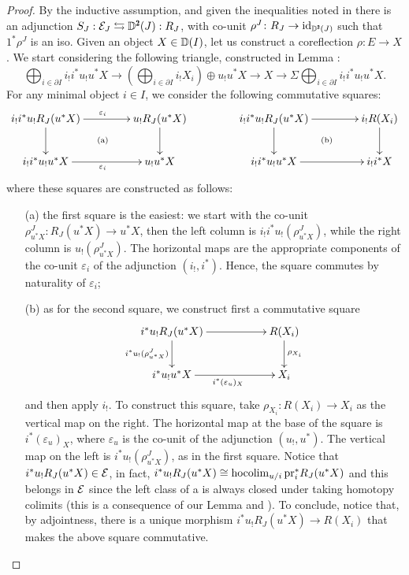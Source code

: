 \begin{proof}
By the inductive assumption, and given the inequalities noted in  there is an adjunction $S_J: \E_J\leftrightarrows \D^\due(J):R_J$, with co-unit $\rho^J\colon R_J\to \id_{\D^\due(J)}$ such that $1^*\rho^J$ is an iso. Given an object $X\in \mathbb{D}(I)$, let us construct a coreflection $\rho\colon E\to X$. We start considering the following triangle, constructed in Lemma :
\[
\bigoplus_{i\in\partial I}i_!i^*u_!u^*{X}\to \left(\bigoplus_{i\in\partial I}i_!{X}_i\right)\oplus u_!u^*{X}\to {X}\to \Sigma \bigoplus_{i\in\partial I}i_!i^*u_!u^*{X}.
\]
For any minimal object $i\in I$, we consider the following commutative squares:
\[
\xymatrix@C=18pt{
i_!i^*u_!R_J(u^*X)\ar@{}[drr]|{(\mathrm{a})}\ar[d]\ar[rr]^{\varepsilon_i}&&u_!R_J(u^*X)\ar[d]&&i_!i^*u_!R_J(u^*X)\ar@{}[drr]|{(\mathrm{b})}\ar[d]\ar[rr]&&i_!R(X_i)\ar[d]\\
i_!i^*u_!u^*X\ar[rr]_{\varepsilon_i}&&u_!u^*X&&i_!i^*u_!u^*X\ar[rr]&&i_!i^*X
}
\]
where these squares are constructed as follows:
\begin{enumerate}
\item[(a)] the first square is the easiest: we start with the co-unit $\rho^J_{u^*X}\colon R_J(u^*X)\to u^*X$, then the left column is $i_!i^*u_!(\rho^J_{u^*X})$, while the right column is $u_!(\rho^J_{u^*X})$. The horizontal maps are the appropriate components of the co-unit $\varepsilon_i$ of the adjunction $(i_!,i^*)$. Hence, the square commutes by naturality of $\varepsilon_i$;
\item[(b)] as for the second square, we construct first a commutative square
\[
\xymatrix{
i^*u_!R_J(u^*X)\ar[d]_{i^*u_!(\rho^J_{u^*X})}\ar[rr]&&R(X_i)\ar[d]^{\rho_{X_i}}\\
i^*u_!u^*X\ar[rr]_{i^*(\varepsilon_u)_{X}}&&X_i
}
\]
and then apply $i_!$. To construct this square, take $\rho_{X_i}\colon R(X_i)\to X_i$ as the vertical map on the right. The horizontal map at the base of the square is $i^*(\varepsilon_u)_{X}$, where $\varepsilon_u$ is the co-unit of the adjunction $(u_!,u^*)$. The vertical map on the left is $i^*u_!(\rho^J_{u^*X})$, as in the first square. Notice that $i^*u_!R_J(u^*X)\in \mathcal{E}$, in fact, $i^*u_!R_J(u^*X)\cong\operatorname{hocolim}_{u/i}\mathrm{pr}_i^* R_J(u^*X)$ and this belongs in $\mathcal{E}$ since the left class of a \hfs is always closed under taking homotopy colimits (this is a consequence of our Lemma  and \cite[Theorem 7.1]{Ponto-Schulman}). To conclude, notice that, by adjointness, there is a unique morphism $i^*u_!R_J(u^*X)\to R(X_i)$ that makes the above square commutative. 

\end{enumerate}
\end{proof}
